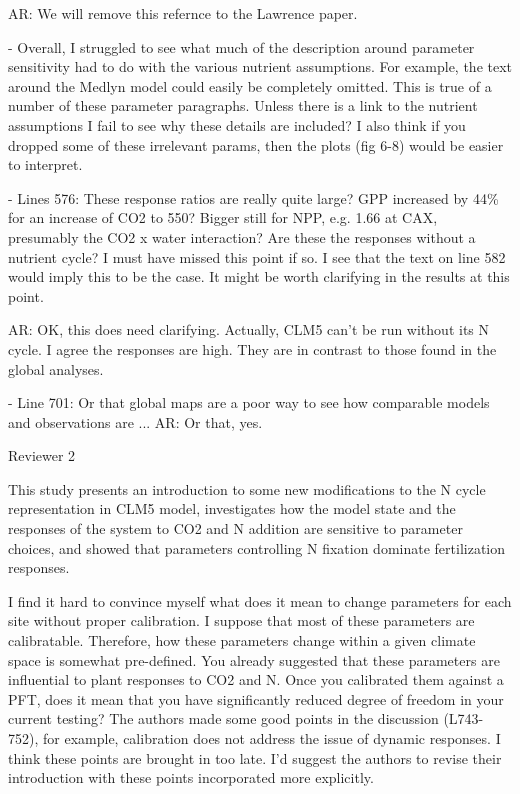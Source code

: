 \documentclass{article}
\begin{document}
\textsf{AR: We will remove this refernce to the Lawrence paper.}

- Overall, I struggled to see what much of the description around parameter sensitivity had to do with the various nutrient assumptions. For example, the text around the Medlyn model could easily be completely omitted. This is true of a number of these parameter paragraphs. Unless there is a link to the nutrient assumptions I fail to see why these details are included? I also think if you dropped some of these irrelevant params, then the plots (fig 6-8) would be easier to interpret. 

- Lines 576: These response ratios are really quite large? GPP increased by 44\% for an increase of CO2 to 550? Bigger still for NPP, e.g. 1.66 at CAX, presumably the CO2 x water interaction? Are these the responses without a nutrient cycle? I must have missed this point if so. I see that the text on line 582 would imply this to be the case. It might be worth clarifying in the results at this point. 

\textsf{AR: OK, this does need clarifying. Actually, CLM5 can't be run without its N cycle. I agree the responses are high. They are in contrast to those found in the global analyses. }

- Line 701: Or that global maps are a poor way to see how comparable models and observations are ... 
\textsf{AR: Or that, yes. }

Reviewer 2 

This study presents an introduction to some new modifications to the N cycle representation in CLM5 model, investigates how the model state and the responses of the system to CO2 and N addition are sensitive to parameter choices, and showed that parameters controlling N fixation dominate fertilization responses. 

I find it hard to convince myself what does it mean to change parameters for each site without proper calibration. I suppose that most of these parameters are calibratable. Therefore, how these parameters change within a given climate space is somewhat pre-defined. You already suggested that these parameters are influential to plant responses to CO2 and N. Once you calibrated them against a PFT, does it mean that you have significantly reduced degree of freedom in your current testing? The authors made some good points in the discussion (L743-752), for example, calibration does not address the issue of dynamic responses. I think these points are brought in too late. I'd suggest the authors to revise their introduction with these points incorporated more explicitly.
\end{document}
